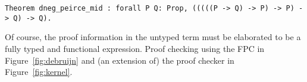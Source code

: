 \begin{lstlisting}[basicstyle=\ttfamily,language=lprolog]
Theorem dneg_peirce_mid : forall P Q: Prop, (((((P -> Q) -> P) -> P) -> Q) -> Q).
\end{lstlisting}

Of course, the proof information in the untyped term must be
elaborated to be a fully typed and functional expression.  Proof
checking using the FPC in Figure~\ref{fig:debruijn} and (an extension
of) the proof checker in Figure~\ref{fig:kernel}.



